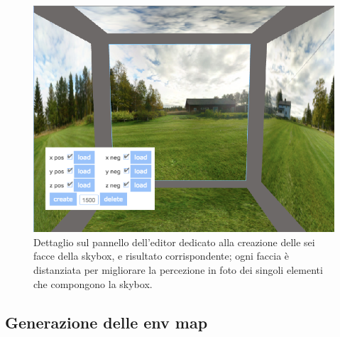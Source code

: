 \\
\begin{figure}[htb]
 \centering
 \includegraphics[width=1\linewidth]{images/chapter_creazione_scena/editor_4.png}\hfill
 \caption[Creazione Skybox]{Dettaglio sul pannello dell'editor dedicato alla creazione delle sei facce della skybox, e risultato corrispondente; ogni faccia è distanziata per migliorare la percezione in foto dei singoli elementi che compongono la skybox.}
 \label{fig:editor_4}
\end{figure} 

\subsection{Generazione delle env map}
\label{sec:chapter_creazione_scena_funzionalita_editor_envmap}

